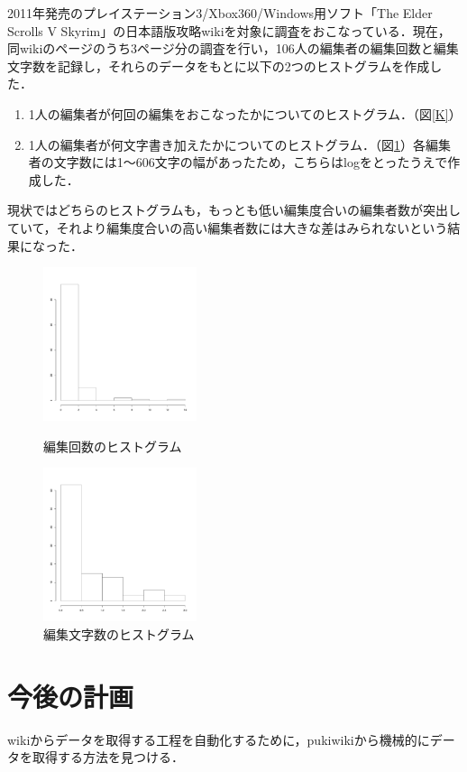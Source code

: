 \documentclass[uplatex,twocolumn,dvipdfmx]{jsarticle}
\begin{document}
2011年発売のプレイステーション3/Xbox360/Windows用ソフト「The Elder Scrolls V Skyrim」\cite{wikipedia}の日本語版攻略wiki\cite{wiki}を対象に調査をおこなっている．現在，同wikiのページのうち3ページ分の調査を行い，106人の編集者の編集回数と編集文字数を記録し，それらのデータをもとに以下の2つのヒストグラムを作成した．


\begin{enumerate}
\item 1人の編集者が何回の編集をおこなったかについてのヒストグラム．（図\ref{K}）
\item 1人の編集者が何文字書き加えたかについてのヒストグラム．（図\ref{G}）各編集者の文字数には1～606文字の幅があったため，こちらはlogをとったうえで作成した．
\end{enumerate}

現状ではどちらのヒストグラムも，もっとも低い編集度合いの編集者数が突出していて，それより編集度合いの高い編集者数には大きな差はみられないという結果になった．

\begin{figure}[thbp]
 \begin{minipage}{0.5\hsize}
  \begin{center}
   \includegraphics[width=45mm]{skyrmK.pdf}
   \caption{編集回数のヒストグラム}
   \label{K}
  \end{center}
 \end{minipage}%
 \begin{minipage}{0.5\hsize}
  \begin{center}
   \includegraphics[width=45mm]{skyrmG.pdf}
   \caption{編集文字数のヒストグラム}
   \label{G}
  \end{center}
 \end{minipage}
\end{figure}


\section{今後の計画}

wikiからデータを取得する工程を自動化するために，pukiwikiから機械的にデータを取得する方法を見つける．


\end{document}
